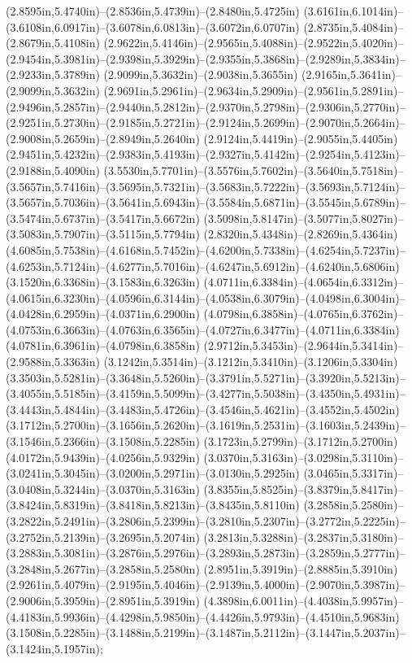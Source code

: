 (2.8595in,5.4740in)--(2.8536in,5.4739in)--(2.8480in,5.4725in) (3.6161in,6.1014in)--(3.6108in,6.0917in)--(3.6078in,6.0813in)--(3.6072in,6.0707in) (2.8735in,5.4084in)--(2.8679in,5.4108in) (2.9622in,5.4146in)--(2.9565in,5.4088in)--(2.9522in,5.4020in)--(2.9454in,5.3981in)--(2.9398in,5.3929in)--(2.9355in,5.3868in)--(2.9289in,5.3834in)--(2.9233in,5.3789in) (2.9099in,5.3632in)--(2.9038in,5.3655in) (2.9165in,5.3641in)--(2.9099in,5.3632in) (2.9691in,5.2961in)--(2.9634in,5.2909in)--(2.9561in,5.2891in)--(2.9496in,5.2857in)--(2.9440in,5.2812in)--(2.9370in,5.2798in)--(2.9306in,5.2770in)--(2.9251in,5.2730in)--(2.9185in,5.2721in)--(2.9124in,5.2699in)--(2.9070in,5.2664in)--(2.9008in,5.2659in)--(2.8949in,5.2640in) (2.9124in,5.4419in)--(2.9055in,5.4405in) (2.9451in,5.4232in)--(2.9383in,5.4193in)--(2.9327in,5.4142in)--(2.9254in,5.4123in)--(2.9188in,5.4090in) (3.5530in,5.7701in)--(3.5576in,5.7602in)--(3.5640in,5.7518in)--(3.5657in,5.7416in)--(3.5695in,5.7321in)--(3.5683in,5.7222in)--(3.5693in,5.7124in)--(3.5657in,5.7036in)--(3.5641in,5.6943in)--(3.5584in,5.6871in)--(3.5545in,5.6789in)--(3.5474in,5.6737in)--(3.5417in,5.6672in) (3.5098in,5.8147in)--(3.5077in,5.8027in)--(3.5083in,5.7907in)--(3.5115in,5.7794in) (2.8320in,5.4348in)--(2.8269in,5.4364in) (4.6085in,5.7538in)--(4.6168in,5.7452in)--(4.6200in,5.7338in)--(4.6254in,5.7237in)--(4.6253in,5.7124in)--(4.6277in,5.7016in)--(4.6247in,5.6912in)--(4.6240in,5.6806in) (3.1520in,6.3368in)--(3.1583in,6.3263in) (4.0711in,6.3384in)--(4.0654in,6.3312in)--(4.0615in,6.3230in)--(4.0596in,6.3144in)--(4.0538in,6.3079in)--(4.0498in,6.3004in)--(4.0428in,6.2959in)--(4.0371in,6.2900in) (4.0798in,6.3858in)--(4.0765in,6.3762in)--(4.0753in,6.3663in)--(4.0763in,6.3565in)--(4.0727in,6.3477in)--(4.0711in,6.3384in) (4.0781in,6.3961in)--(4.0798in,6.3858in) (2.9712in,5.3453in)--(2.9644in,5.3414in)--(2.9588in,5.3363in) (3.1242in,5.3514in)--(3.1212in,5.3410in)--(3.1206in,5.3304in) (3.3503in,5.5281in)--(3.3648in,5.5260in)--(3.3791in,5.5271in)--(3.3920in,5.5213in)--(3.4055in,5.5185in)--(3.4159in,5.5099in)--(3.4277in,5.5038in)--(3.4350in,5.4931in)--(3.4443in,5.4844in)--(3.4483in,5.4726in)--(3.4546in,5.4621in)--(3.4552in,5.4502in) (3.1712in,5.2700in)--(3.1656in,5.2620in)--(3.1619in,5.2531in)--(3.1603in,5.2439in)--(3.1546in,5.2366in)--(3.1508in,5.2285in) (3.1723in,5.2799in)--(3.1712in,5.2700in) (4.0172in,5.9439in)--(4.0256in,5.9329in) (3.0370in,5.3163in)--(3.0298in,5.3110in)--(3.0241in,5.3045in)--(3.0200in,5.2971in)--(3.0130in,5.2925in) (3.0465in,5.3317in)--(3.0408in,5.3244in)--(3.0370in,5.3163in) (3.8355in,5.8525in)--(3.8379in,5.8417in)--(3.8424in,5.8319in)--(3.8418in,5.8213in)--(3.8435in,5.8110in) (3.2858in,5.2580in)--(3.2822in,5.2491in)--(3.2806in,5.2399in)--(3.2810in,5.2307in)--(3.2772in,5.2225in)--(3.2752in,5.2139in)--(3.2695in,5.2074in) (3.2813in,5.3288in)--(3.2837in,5.3180in)--(3.2883in,5.3081in)--(3.2876in,5.2976in)--(3.2893in,5.2873in)--(3.2859in,5.2777in)--(3.2848in,5.2677in)--(3.2858in,5.2580in) (2.8951in,5.3919in)--(2.8885in,5.3910in) (2.9261in,5.4079in)--(2.9195in,5.4046in)--(2.9139in,5.4000in)--(2.9070in,5.3987in)--(2.9006in,5.3959in)--(2.8951in,5.3919in) (4.3898in,6.0011in)--(4.4038in,5.9957in)--(4.4183in,5.9936in)--(4.4298in,5.9850in)--(4.4426in,5.9793in)--(4.4510in,5.9683in) (3.1508in,5.2285in)--(3.1488in,5.2199in)--(3.1487in,5.2112in)--(3.1447in,5.2037in)--(3.1424in,5.1957in);
